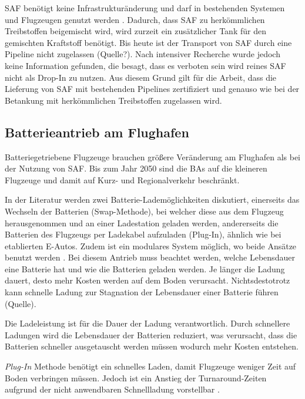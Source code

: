 SAF benötigt keine Infrastrukturänderung und darf in bestehenden Systemen 
und Flugzeugen genutzt werden \cite{dalmia2022powering}.
Dadurch, dass SAF zu herkömmlichen Treibstoffen beigemischt wird, 
wird zurzeit ein zusätzlicher Tank für den gemischten Kraftstoff benötigt. 
Bis heute ist der Transport von SAF durch eine Pipeline nicht zugelassen (Quelle?).
Nach intensiver Recherche wurde jedoch keine Information gefunden, 
die besagt, dass es verboten sein wird reines SAF nicht als Drop-In zu nutzen. %
Aus diesem Grund gilt für die Arbeit, dass die Lieferung von SAF mit bestehenden Pipelines 
zertifiziert und genauso wie bei der Betankung mit herkömmlichen Treibstoffen zugelassen wird.

\subsection{Batterieantrieb am Flughafen}
Batteriegetriebene Flugzeuge brauchen größere Veränderung am 
Flughafen als bei der Nutzung von SAF.
Bis zum Jahr 2050 sind die BAs auf die kleineren Flugzeuge 
und damit auf Kurz- und Regionalverkehr beschränkt. 

In der Literatur werden zwei Batterie-Lademöglichkeiten diskutiert, 
einerseits das Wechseln der Batterien (Swap-Methode), 
bei welcher diese aus dem Flugzeug herausgenommen und an einer Ladestation geladen werden, 
andererseits die Batterien des Flugzeugs per Ladekabel aufzuladen (Plug-In), 
ähnlich wie bei etablierten E-Autos.
Zudem ist ein modulares System möglich, wo beide Ansätze benutzt werden \cite{salucci2020optimal}.
%
Bei diesem Antrieb muss beachtet werden, 
welche Lebensdauer eine Batterie hat und wie die Batterien geladen werden. 
Je länger die Ladung dauert, desto mehr Kosten werden auf dem Boden verursacht. 
Nichtsdestotrotz kann schnelle Ladung zur Stagnation der Lebensdauer einer Batterie führen (Quelle).

Die Ladeleistung ist für die Dauer der Ladung verantwortlich. 
Durch schnellere Ladungen wird die Lebensdauer der Batterien reduziert,
was verursacht, dass die Batterien schneller ausgetauscht werden 
müssen wodurch mehr Kosten entstehen.

%
\textit{Plug-In} Methode benötigt ein schnelles Laden, 
damit Flugzeuge weniger Zeit auf Boden verbringen müssen.
Jedoch ist ein Anstieg der Turnaround-Zeiten aufgrund der 
nicht anwendbaren Schnellladung vorstellbar \cite{avogadro2024demystifying}.

